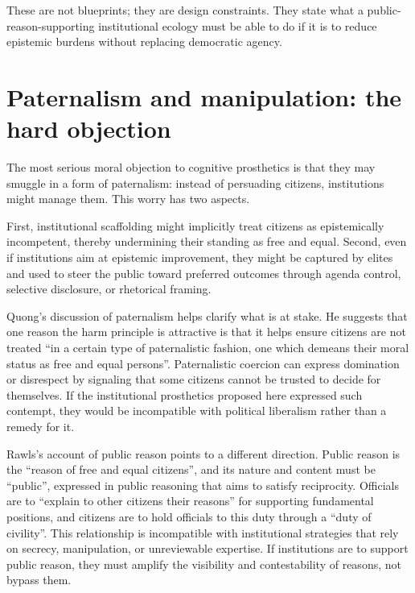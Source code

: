 \documentclass[12pt]{report}
\begin{document}
These are not blueprints; they are design constraints.
They state what a public-reason-supporting institutional ecology must be able to do if it is to reduce epistemic burdens without replacing democratic agency.

\section{Paternalism and manipulation: the hard objection}

The most serious moral objection to cognitive prosthetics is that they may smuggle in a form of paternalism: instead of persuading citizens, institutions might manage them.
This worry has two aspects.

First, institutional scaffolding might implicitly treat citizens as epistemically incompetent, thereby undermining their standing as free and equal.
Second, even if institutions aim at epistemic improvement, they might be captured by elites and used to steer the public toward preferred outcomes through agenda control, selective disclosure, or rhetorical framing.

Quong’s discussion of paternalism helps clarify what is at stake.
He suggests that one reason the harm principle is attractive is that it helps ensure citizens are not treated \enquote{in a certain type of paternalistic fashion, one which demeans their moral status as free and equal persons}. \parencite[p.~56]{quong2011liberalism}
Paternalistic coercion can express domination or disrespect by signaling that some citizens cannot be trusted to decide for themselves. \parencite[p.~58]{quong2011liberalism}
If the institutional prosthetics proposed here expressed such contempt, they would be incompatible with political liberalism rather than a remedy for it.

Rawls’s account of public reason points to a different direction.
Public reason is the \enquote{reason of free and equal citizens}, and its nature and content must be \enquote{public}, expressed in public reasoning that aims to satisfy reciprocity. \parencite[p.~767]{rawls1997public}
Officials are to \enquote{explain to other citizens their reasons} for supporting fundamental positions, and citizens are to hold officials to this duty through a \enquote{duty of civility}. \parencite[p.~769]{rawls1997public}
This relationship is incompatible with institutional strategies that rely on secrecy, manipulation, or unreviewable expertise.
If institutions are to support public reason, they must amplify the visibility and contestability of reasons, not bypass them.
\end{document}
